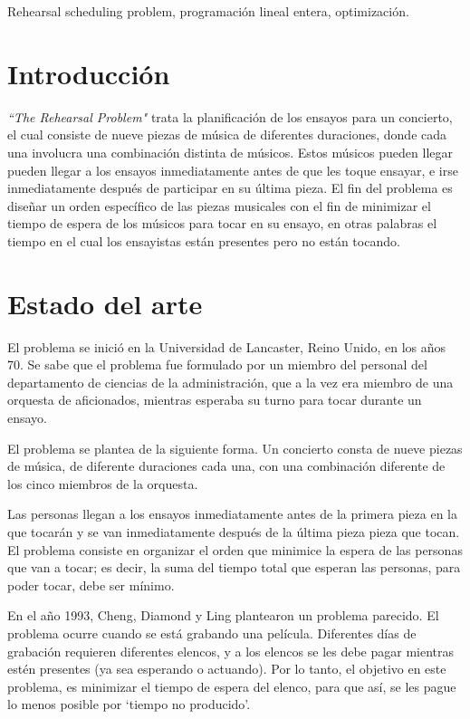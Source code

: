 \documentclass[journal, 10pt]{IEEEtran}
\begin{document}
\begin{IEEEkeywords}
	Rehearsal scheduling problem, programación lineal entera, optimización.
\end{IEEEkeywords}

\section{Introducción}

\textit{``The Rehearsal Problem"} trata la planificación de los ensayos para un concierto, el cual consiste de nueve piezas de música de diferentes duraciones, donde cada una involucra una combinación distinta de músicos. Estos músicos pueden llegar pueden llegar a los ensayos inmediatamente antes de que les toque ensayar, e irse inmediatamente después de participar en su última pieza. El fin del problema es diseñar un orden específico de las piezas musicales con el fin de minimizar el tiempo de espera de los músicos para tocar en su ensayo, en otras palabras el tiempo en el cual los ensayistas están presentes pero no están tocando. 

\section{Estado del arte}

El problema se inició en la Universidad de Lancaster, Reino Unido, en los años 70. Se sabe que el problema fue formulado por un miembro del personal del departamento de ciencias de la administración, que a la vez era miembro de una orquesta de aficionados, mientras esperaba su turno para tocar durante un ensayo.

El problema se plantea de la siguiente forma. Un concierto consta de nueve piezas de música, de diferente duraciones cada una, con una combinación diferente de los cinco miembros de la orquesta.

Las personas llegan a los ensayos inmediatamente antes de la primera pieza en la que tocarán y se van inmediatamente después de la última pieza pieza que tocan. El problema consiste en organizar el orden que minimice la espera de las personas que van a tocar; es decir, la suma del tiempo total que esperan las personas, para poder tocar, debe ser mínimo.

En el año 1993, Cheng, Diamond y Ling\cite{ref1} plantearon un problema parecido. El problema ocurre cuando se está grabando una película. Diferentes días de grabación requieren diferentes elencos, y a los elencos se les debe pagar mientras estén presentes (ya sea esperando o actuando). Por lo tanto, el objetivo en este problema, es minimizar el tiempo de espera del elenco, para que así, se les pague lo menos posible por `tiempo no producido'.
\end{document}
